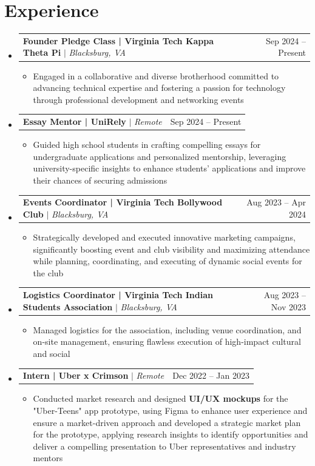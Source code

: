 \documentclass[a4paper,11pt]{article}
\makeatletter
\newcommand{\resumeItem}[1]{
  \item\small{
    {#1 \vspace{-2pt}}
  }
}
\newcommand{\resumeProjectHeading}[2]{
    \item
    \begin{tabular*}{0.97\textwidth}{l@{\extracolsep{\fill}}r}
      \small#1 & #2 \\
    \end{tabular*}\vspace{-7pt}
}
\newcommand{\resumeSubHeadingListStart}{\begin{itemize}[leftmargin=0.15in, label={}]}
\newcommand{\resumeSubHeadingListEnd}{\end{itemize}}
\newcommand{\resumeItemListStart}{\begin{itemize}}
\newcommand{\resumeItemListEnd}{\end{itemize}\vspace{-8pt}} %
\makeatother
\begin{document}
\section{Experience}
  \resumeSubHeadingListStart
      \resumeProjectHeading
        {\textbf{Founder Pledge Class | Virginia Tech Kappa Theta Pi} $|$ \emph{Blacksburg, VA}} {Sep 2024 -- Present}
        \resumeItemListStart
         \resumeItem{Engaged in a collaborative and diverse brotherhood committed to advancing technical expertise and fostering a passion for technology through professional development and networking events}
        \resumeItemListEnd
      \resumeProjectHeading
        {\textbf{Essay Mentor | UniRely} $|$ \emph{Remote}} {Sep 2024 -- Present}
        \resumeItemListStart
         \resumeItem{Guided high school students in crafting compelling essays for undergraduate applications and personalized mentorship, leveraging university-specific insights to enhance students' applications and improve their chances of securing admissions}
        \resumeItemListEnd
      \resumeProjectHeading
        {\textbf{Events Coordinator | Virginia Tech Bollywood Club} $|$ \emph{Blacksburg, VA}} {Aug 2023 -- Apr 2024}
        \resumeItemListStart
         \resumeItem{Strategically developed and executed innovative marketing campaigns, significantly boosting event and club visibility and maximizing attendance while planning, coordinating, and executing of dynamic social events for the club}
        \resumeItemListEnd
      \resumeProjectHeading
        {\textbf{Logistics Coordinator | Virginia Tech Indian Students Association} $|$ \emph{Blacksburg, VA}} {Aug 2023 -- Nov 2023}
        \resumeItemListStart
         \resumeItem{Managed logistics for the association, including venue coordination, and on-site management, ensuring flawless execution of high-impact cultural and social}
        \resumeItemListEnd
      \resumeProjectHeading
        {\textbf{Intern | Uber x Crimson} $|$ \emph{Remote}} {Dec 2022 -- Jan 2023}
        \resumeItemListStart
         \resumeItem{Conducted market research and designed \textbf{UI/UX mockups} for the "Uber-Teens" app prototype, using Figma to enhance user experience and ensure a market-driven approach and developed a strategic market plan for the prototype, applying research insights to identify opportunities and deliver a compelling presentation to Uber representatives and industry mentors   }
        \resumeItemListEnd
  \resumeSubHeadingListEnd

\end{document}
